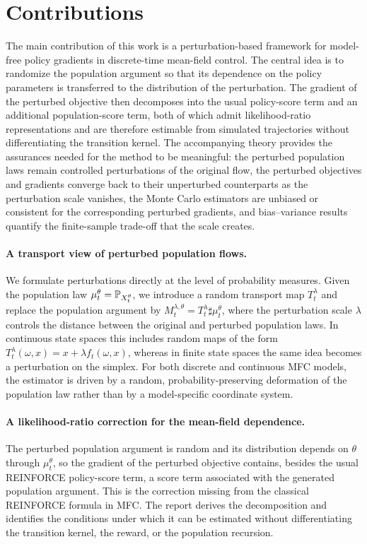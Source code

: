 \section{Contributions}

The main contribution of this work is a perturbation-based framework for model-free policy gradients in discrete-time mean-field control. The central idea is to randomize the population argument so that its dependence on the policy parameters is transferred to the distribution of the perturbation. The gradient of the perturbed objective then decomposes into the usual policy-score term and an additional population-score term, both of which admit likelihood-ratio representations and are therefore estimable from simulated trajectories without differentiating the transition kernel. The accompanying theory provides the assurances needed for the method to be meaningful: the perturbed population laws remain controlled perturbations of the original flow, the perturbed objectives and gradients converge back to their unperturbed counterparts as the perturbation scale vanishes, the Monte Carlo estimators are unbiased or consistent for the corresponding perturbed gradients, and bias--variance results quantify the finite-sample trade-off that the scale creates.

\paragraph{A transport view of perturbed population flows.}
We formulate perturbations directly at the level of probability measures. Given the population law $\mu_t^\theta=\P_{X_t^\theta}$, we introduce a random transport map $T_t^\lambda$ and replace the population argument by $M_t^{\lambda,\theta} = T_t^\lambda\sharp \mu_t^\theta$, where the perturbation scale $\lambda$ controls the distance between the original and perturbed population laws. In continuous state spaces this includes random maps of the form $T_t^\lambda(\omega,x)=x+\lambda f_t(\omega,x)$, whereas in finite state spaces the same idea becomes a perturbation on the simplex. For both discrete and continuous MFC models, the estimator is driven by a random, probability-preserving deformation of the population law rather than by a model-specific coordinate system.

\paragraph{A likelihood-ratio correction for the mean-field dependence.}
The perturbed population argument is random and its distribution depends on $\theta$ through $\mu_t^\theta$, so the gradient of the perturbed objective contains, besides the usual REINFORCE policy-score term, a score term associated with the generated population argument. This is the correction missing from the classical REINFORCE formula in MFC. The report derives the decomposition and identifies the conditions under which it can be estimated without differentiating the transition kernel, the reward, or the population recursion.

